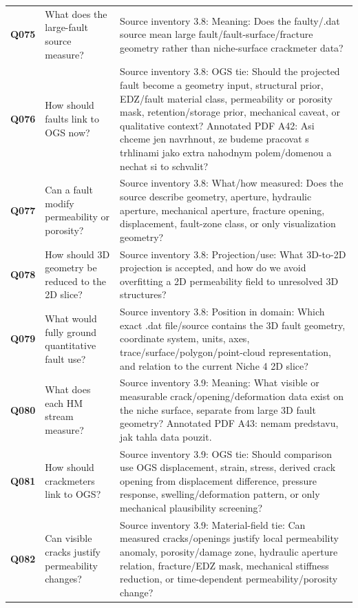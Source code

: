 \begin{longtable}{@{}L{0.10\textwidth} L{0.30\textwidth} L{0.52\textwidth}@{}}
\addlinespace[0.22em]
\textbf{Q075} & What does the large-fault source measure? & Source inventory 3.8: Meaning: Does the faulty/.dat source mean large fault/fault-surface/fracture geometry rather than niche-surface crackmeter data?\\
\addlinespace[0.22em]
\textbf{Q076} & How should faults link to OGS now? & Source inventory 3.8: OGS tie: Should the projected fault become a geometry input, structural prior, EDZ/fault material class, permeability or porosity mask, retention/storage prior, mechanical caveat, or qualitative context? Annotated PDF A42: Asi chceme jen navrhnout, ze budeme pracovat s trhlinami jako extra nahodnym polem/domenou a nechat si to schvalit?\\
\addlinespace[0.22em]
\textbf{Q077} & Can a fault modify permeability or porosity? & Source inventory 3.8: What/how measured: Does the source describe geometry, aperture, hydraulic aperture, mechanical aperture, fracture opening, displacement, fault-zone class, or only visualization geometry?\\
\addlinespace[0.22em]
\textbf{Q078} & How should 3D geometry be reduced to the 2D slice? & Source inventory 3.8: Projection/use: What 3D-to-2D projection is accepted, and how do we avoid overfitting a 2D permeability field to unresolved 3D structures?\\
\addlinespace[0.22em]
\textbf{Q079} & What would fully ground quantitative fault use? & Source inventory 3.8: Position in domain: Which exact .dat file/source contains the 3D fault geometry, coordinate system, units, axes, trace/surface/polygon/point-cloud representation, and relation to the current Niche 4 2D slice?\\
\addlinespace[0.22em]
\textbf{Q080} & What does each HM stream measure? & Source inventory 3.9: Meaning: What visible or measurable crack/opening/deformation data exist on the niche surface, separate from large 3D fault geometry? Annotated PDF A43: nemam predstavu, jak tahla data pouzit.\\
\addlinespace[0.22em]
\textbf{Q081} & How should crackmeters link to OGS? & Source inventory 3.9: OGS tie: Should comparison use OGS displacement, strain, stress, derived crack opening from displacement difference, pressure response, swelling/deformation pattern, or only mechanical plausibility screening?\\
\addlinespace[0.22em]
\textbf{Q082} & Can visible cracks justify permeability changes? & Source inventory 3.9: Material-field tie: Can measured cracks/openings justify local permeability anomaly, porosity/damage zone, hydraulic aperture relation, fracture/EDZ mask, mechanical stiffness reduction, or time-dependent permeability/porosity change?\\

\end{longtable}
